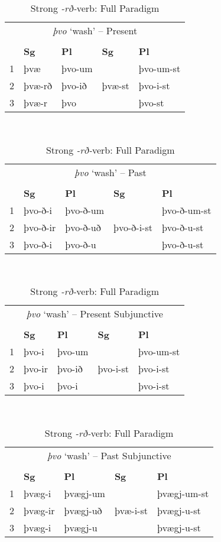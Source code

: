 \documentclass[output=paper,colorlinks,citecolor=brown,
]{langscibook}
\begin{document}
\begin{table}[h]
\caption{Strong \textit{-rð-}verb: Full Paradigm} \label{woodwash}
\small
\begin{tabular}{l|l|l|||l|l}
\multicolumn{5}{c}{\textit{þvo} `wash' -- Present} \\
\multicolumn{5}{c}{} \\
\hline
  & \textbf{Sg} & \textbf{Pl}  & \textbf{Sg} & \textbf{Pl} \\
  \hline\hline
1 & þvæ & þvo-um  	&  			&  þvo-um-st \\
2 & þvæ-rð & þvo-ið 		& þvæ-st 	&  þvo-i-st  \\
3 & þvæ-r  & þvo 		& 		& þvo-st  \\
\end{tabular} \\[1em]
\begin{tabular}{l|l|l|||l|l}
\multicolumn{5}{c}{\textit{þvo} `wash' -- Past} \\
\multicolumn{5}{c}{} \\
\hline
  & \textbf{Sg} & \textbf{Pl}  & \textbf{Sg} & \textbf{Pl} \\
  \hline\hline
1 & þvo-ð-i & þvo-ð-um  	&  			&  þvo-ð-um-st \\
2 & þvo-ð-ir & þvo-ð-uð 		& þvo-ð-i-st 	&  þvo-ð-u-st  \\
3 & þvo-ð-i  & þvo-ð-u 		& 		& þvo-ð-u-st  \\
\end{tabular} \\[1em]
\begin{tabular}{l|l|l|||l|l}
\multicolumn{5}{c}{\textit{þvo} `wash' -- Present Subjunctive} \\
\multicolumn{5}{c}{} \\
\hline
  & \textbf{Sg} & \textbf{Pl}  & \textbf{Sg} & \textbf{Pl} \\
  \hline\hline
1 & þvo-i & þvo-um  	&  			&  þvo-um-st \\
2 & þvo-ir & þvo-ið 		& þvo-i-st 	&  þvo-i-st  \\
3 & þvo-i  & þvo-i 		& 		& þvo-i-st  \\
\end{tabular} \\[1em]
\begin{tabular}{l|l|l|||l|l}
\multicolumn{5}{c}{\textit{þvo} `wash' -- Past Subjunctive} \\
\multicolumn{5}{c}{} \\
\hline
  & \textbf{Sg} & \textbf{Pl}  & \textbf{Sg} & \textbf{Pl} \\
  \hline\hline
1 & þvæg-i & þvægj-um  	&  			&  þvægj-um-st \\
2 & þvæg-ir & þvægj-uð 		& þvæ-i-st 	&  þvægj-u-st  \\
3 & þvæg-i  & þvægj-u 		& 		& þvægj-u-st  \\
\end{tabular}
\end{table}
\end{document}
